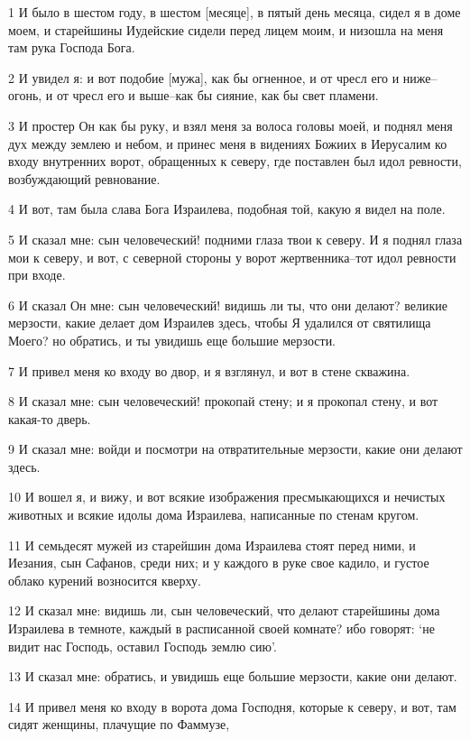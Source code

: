 \par 1 И было в шестом году, в шестом [месяце], в пятый день месяца, сидел я в доме моем, и старейшины Иудейские сидели перед лицем моим, и низошла на меня там рука Господа Бога.
\par 2 И увидел я: и вот подобие [мужа], как бы огненное, и от чресл его и ниже--огонь, и от чресл его и выше--как бы сияние, как бы свет пламени.
\par 3 И простер Он как бы руку, и взял меня за волоса головы моей, и поднял меня дух между землею и небом, и принес меня в видениях Божиих в Иерусалим ко входу внутренних ворот, обращенных к северу, где поставлен был идол ревности, возбуждающий ревнование.
\par 4 И вот, там была слава Бога Израилева, подобная той, какую я видел на поле.
\par 5 И сказал мне: сын человеческий! подними глаза твои к северу. И я поднял глаза мои к северу, и вот, с северной стороны у ворот жертвенника--тот идол ревности при входе.
\par 6 И сказал Он мне: сын человеческий! видишь ли ты, что они делают? великие мерзости, какие делает дом Израилев здесь, чтобы Я удалился от святилища Моего? но обратись, и ты увидишь еще большие мерзости.
\par 7 И привел меня ко входу во двор, и я взглянул, и вот в стене скважина.
\par 8 И сказал мне: сын человеческий! прокопай стену; и я прокопал стену, и вот какая-то дверь.
\par 9 И сказал мне: войди и посмотри на отвратительные мерзости, какие они делают здесь.
\par 10 И вошел я, и вижу, и вот всякие изображения пресмыкающихся и нечистых животных и всякие идолы дома Израилева, написанные по стенам кругом.
\par 11 И семьдесят мужей из старейшин дома Израилева стоят перед ними, и Иезания, сын Сафанов, среди них; и у каждого в руке свое кадило, и густое облако курений возносится кверху.
\par 12 И сказал мне: видишь ли, сын человеческий, что делают старейшины дома Израилева в темноте, каждый в расписанной своей комнате? ибо говорят: `не видит нас Господь, оставил Господь землю сию'.
\par 13 И сказал мне: обратись, и увидишь еще большие мерзости, какие они делают.
\par 14 И привел меня ко входу в ворота дома Господня, которые к северу, и вот, там сидят женщины, плачущие по Фаммузе,
